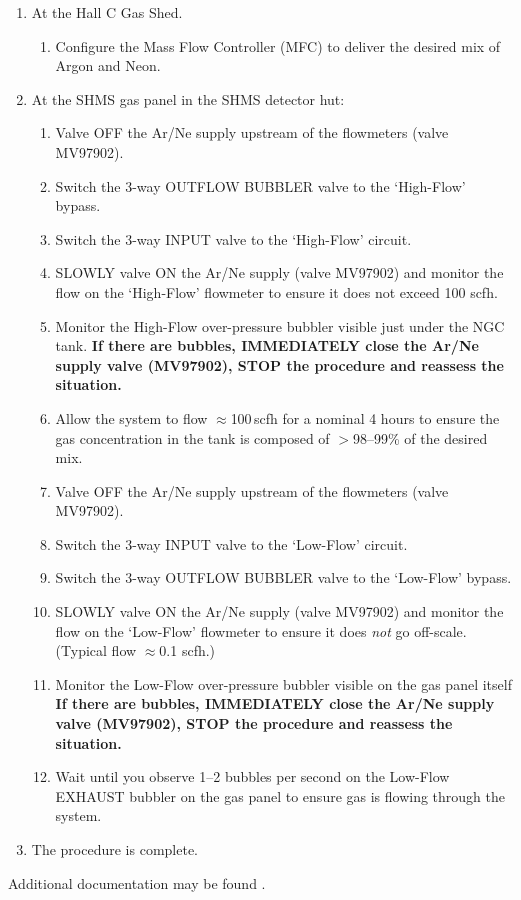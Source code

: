 {\begin{enumerate}
  \item At the Hall C Gas Shed.
    \begin{enumerate}
      \item Configure the Mass Flow Controller (MFC) to deliver the desired mix
        of Argon and Neon.
    \end{enumerate}
  \item At the SHMS gas panel in the SHMS detector hut:
    \begin{enumerate}
      \item Valve OFF the Ar/Ne supply upstream of the flowmeters (valve MV97902).
      \item Switch the 3-way OUTFLOW BUBBLER valve to the `High-Flow' bypass.
      \item Switch the 3-way INPUT valve to the `High-Flow' circuit.
      \item SLOWLY valve ON the Ar/Ne supply (valve MV97902) and monitor the flow on the
        `High-Flow' flowmeter to ensure it does not exceed 100 scfh.
      \item Monitor the High-Flow over-pressure bubbler visible just under the NGC tank.
        \textbf{If there are bubbles, IMMEDIATELY close the Ar/Ne supply valve
        (MV97902), STOP the procedure and reassess the situation.}
      \item Allow the system to flow $\approx$100\,scfh for a nominal 4 hours
        to ensure the gas concentration in the tank is composed of $>$98--99\%
        of the desired mix.
      \item Valve OFF the Ar/Ne supply upstream of the flowmeters (valve MV97902).
      \item Switch the 3-way INPUT valve to the `Low-Flow' circuit.
      \item Switch the 3-way OUTFLOW BUBBLER valve to the `Low-Flow' bypass.
      \item SLOWLY valve ON the Ar/Ne supply (valve MV97902) and monitor the flow on the
        `Low-Flow' flowmeter to ensure it does \emph{not} go off-scale.
        (Typical flow $\approx$0.1 scfh.)
      \item Monitor the Low-Flow over-pressure bubbler visible on the gas panel itself
        \textbf{If there are bubbles, IMMEDIATELY close the Ar/Ne supply valve
        (MV97902), STOP the procedure and reassess the situation.}
      \item Wait until you observe 1--2 bubbles per second on the Low-Flow
        EXHAUST bubbler on the gas panel to ensure gas is flowing through the
        system.
    \end{enumerate}
  \item The procedure is complete.
\end{enumerate}

\vspace{.25in}
Additional documentation may be found \cite{docdb:SHMS-NGC-docs}.

}%
